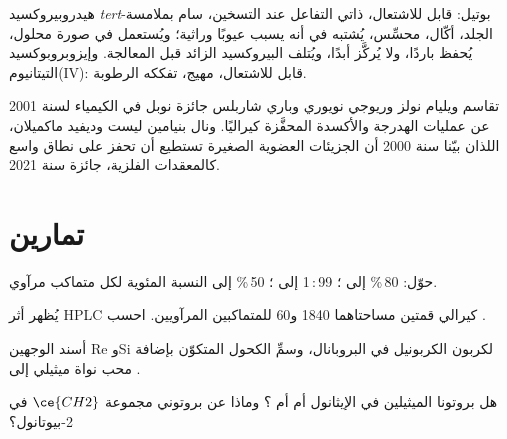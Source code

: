 \begin{safety}{}
هيدروبيروكسيد \textit{tert}-بوتيل: قابل للاشتعال، ذاتي التفاعل عند التسخين، سام بملامسة
الجلد، أكّال، محسِّس، يُشتبه في أنه يسبب عيوبًا وراثية؛ ويُستعمل
في صورة محلول، يُحفظ باردًا، ولا يُركَّز أبدًا، ويُتلف البيروكسيد الزائد
قبل المعالجة. وإيزوبروبوكسيد التيتانيوم(IV): قابل للاشتعال، مهيج، تفككه
الرطوبة.
\end{safety}

\begin{history}
تقاسم ويليام نولز وريوجي نويوري وباري شاربلس جائزة نوبل في الكيمياء لسنة 2001
عن عمليات الهدرجة والأكسدة المحفَّزة كيراليًا. ونال بنيامين ليست
وديفيد ماكميلان، اللذان بيّنا سنة 2000 أن الجزيئات العضوية الصغيرة تستطيع أن
تحفز  على نطاق واسع كالمعقدات الفلزية،
جائزة سنة 2021.
\end{history}

\section{تمارين}

\begin{exercise}[$\star$]\label{exo:b3:asymmetric-synthesis:1}
حوّل:  80\,\% إلى ؛  99\,:\,1 إلى ؛  50\,\% إلى النسبة المئوية لكل
متماكب مرآوي.
\end{exercise}

\begin{exercise}[$\star$]\label{exo:b3:asymmetric-synthesis:2}
يُظهر أثر HPLC كيرالي قمتين مساحتاهما 1840 و60 للمتماكبين المرآويين.
احسب .
\end{exercise}

\begin{exercise}[$\star$]\label{exo:b3:asymmetric-synthesis:3}
أسند الوجهين Re وSi لكربون الكربونيل في البروبانال، وسمِّ الكحول
المتكوّن بإضافة محب نواة ميثيلي إلى .
\end{exercise}

\begin{exercise}[$\star$]\label{exo:b3:asymmetric-synthesis:4}
هل بروتونا الميثيلين في الإيثانول  أم  أم ؟
وماذا عن بروتوني مجموعة $\ce{CH2}$ في 2-بيوتانول؟
\end{exercise}

